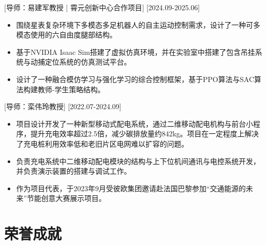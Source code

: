 \documentclass{resume}
\begin{document}
[导师：易建军教授 \textnormal{|} 霄元创新中心合作项目]
[2024.09-2025.06]
\begin{itemize}
  \item 围绕星表复杂环境下多模态多足机器人的自主运动控制需求，设计了一种可多模态使用的六自由度腿部结构。
  \item 基于NVIDIA Isaac Sim搭建了虚拟仿真环境，并在实验室中搭建了包含吊挂系统与动捕定位系统的仿真测试平台。
  \item 设计了一种融合模仿学习与强化学习的综合控制框架，基于PPO算法与SAC算法构建教师-学生策略结构。
\end{itemize}


[导师：栾伟玲教授]
[2022.07-2024.09]
\begin{itemize}
  \item 项目设计开发了一种新型移动式配电系统，通过二维移动配电机构与前台小程序，提升充电效率超过2.5倍，减少碳排放量约842kg。项目在一定程度上解决了充电桩利用效率低和老旧片区电网难以扩容的问题。
  \item 负责充电系统中二维移动配电模块的结构与上下位机间通讯与电控系统开发，并负责演示装置的搭建与调试工作。
  \item 作为项目代表，于2023年9月受彼欧集团邀请赴法国巴黎参加“交通能源的未来”节能创意大赛展示项目。
\end{itemize}


\section{荣誉成就}
\end{document}
